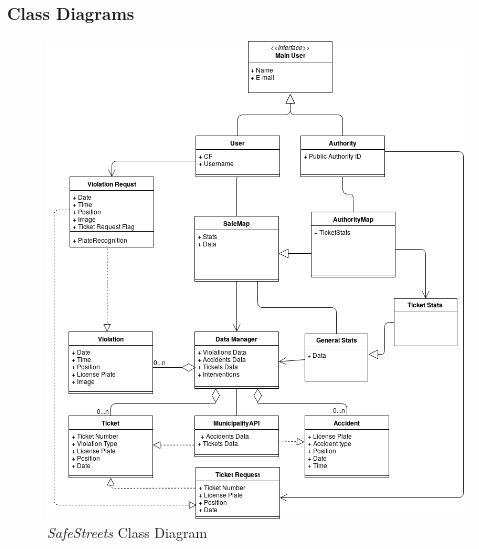 \documentclass {article}
\begin{document}
		
	\subsubsection{Class Diagrams}	
	\begin{figure}[H]
				\centering
				\includegraphics[scale=0.5]{Images/Diagrams/Class_Diagram.png}
				\caption{{\it SafeStreets} Class Diagram}
	\end{figure}
	
\end{document}
